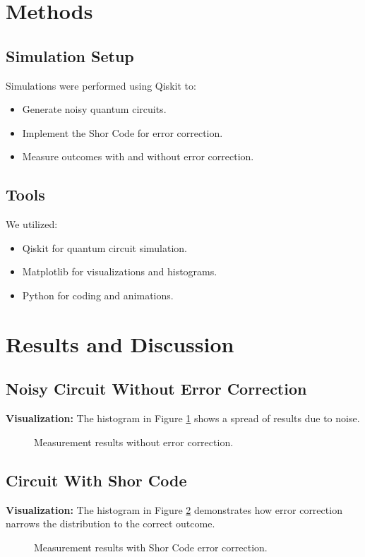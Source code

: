\documentclass[10pt]{article}
\begin{document}
\begin{multicols}{2}
\section*{Methods}
\subsection*{Simulation Setup}
Simulations were performed using Qiskit to:
\begin{itemize}
    \item Generate noisy quantum circuits.
    \item Implement the Shor Code for error correction.
    \item Measure outcomes with and without error correction.
\end{itemize}

\subsection*{Tools}
We utilized:
\begin{itemize}
    \item Qiskit for quantum circuit simulation.
    \item Matplotlib for visualizations and histograms.
    \item Python for coding and animations.
\end{itemize}

\section*{Results and Discussion}
\subsection*{Noisy Circuit Without Error Correction}
\textbf{Visualization:} The histogram in Figure \ref{fig:no_error} shows a spread of results due to noise.
\begin{figure}[H]
    \centering
    \caption{Measurement results without error correction.}
    \label{fig:no_error}
\end{figure}

\subsection*{Circuit With Shor Code}
\textbf{Visualization:} The histogram in Figure \ref{fig:shor_code} demonstrates how error correction narrows the distribution to the correct outcome.
\begin{figure}[H]
    \centering
    \caption{Measurement results with Shor Code error correction.}
    \label{fig:shor_code}
\end{figure}


\end{multicols}
\end{document}
